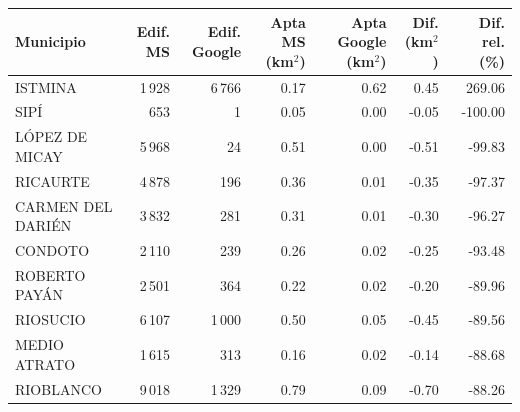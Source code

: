 \begin{tabular}{lrrrrrr}
\toprule
Municipio & Edif. MS & Edif. Google & Apta MS (km$^2$) & Apta Google (km$^2$) & Dif. (km$^2$) & Dif. rel. (\%) \\
\midrule
ISTMINA & 1\,928 & 6\,766 & 0.17 & 0.62 & 0.45 & 269.06 \\
SIPÍ & 653 & 1 & 0.05 & 0.00 & -0.05 & -100.00 \\
LÓPEZ DE MICAY & 5\,968 & 24 & 0.51 & 0.00 & -0.51 & -99.83 \\
RICAURTE & 4\,878 & 196 & 0.36 & 0.01 & -0.35 & -97.37 \\
CARMEN DEL DARIÉN & 3\,832 & 281 & 0.31 & 0.01 & -0.30 & -96.27 \\
CONDOTO & 2\,110 & 239 & 0.26 & 0.02 & -0.25 & -93.48 \\
ROBERTO PAYÁN & 2\,501 & 364 & 0.22 & 0.02 & -0.20 & -89.96 \\
RIOSUCIO & 6\,107 & 1\,000 & 0.50 & 0.05 & -0.45 & -89.56 \\
MEDIO ATRATO & 1\,615 & 313 & 0.16 & 0.02 & -0.14 & -88.68 \\
RIOBLANCO & 9\,018 & 1\,329 & 0.79 & 0.09 & -0.70 & -88.26 \\
\bottomrule
\end{tabular}
